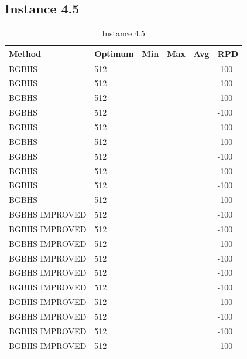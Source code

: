 \subsection{Instance 4.5}
\begin{table}[H]
\centering
\begin{tabular}{ | l | l | l | l | l | l | }
\hline
	Method & Optimum & Min & Max & Avg & RPD \\ \hline
	BGBHS & 512 &  &  &  & -100 \\ \hline
	BGBHS & 512 &  &  &  & -100 \\ \hline
	BGBHS & 512 &  &  &  & -100 \\ \hline
	BGBHS & 512 &  &  &  & -100 \\ \hline
	BGBHS & 512 &  &  &  & -100 \\ \hline
	BGBHS & 512 &  &  &  & -100 \\ \hline
	BGBHS & 512 &  &  &  & -100 \\ \hline
	BGBHS & 512 &  &  &  & -100 \\ \hline
	BGBHS & 512 &  &  &  & -100 \\ \hline
	BGBHS & 512 &  &  &  & -100 \\ \hline
	BGBHS IMPROVED & 512 &  &  &  & -100 \\ \hline
	BGBHS IMPROVED & 512 &  &  &  & -100 \\ \hline
	BGBHS IMPROVED & 512 &  &  &  & -100 \\ \hline
	BGBHS IMPROVED & 512 &  &  &  & -100 \\ \hline
	BGBHS IMPROVED & 512 &  &  &  & -100 \\ \hline
	BGBHS IMPROVED & 512 &  &  &  & -100 \\ \hline
	BGBHS IMPROVED & 512 &  &  &  & -100 \\ \hline
	BGBHS IMPROVED & 512 &  &  &  & -100 \\ \hline
	BGBHS IMPROVED & 512 &  &  &  & -100 \\ \hline
	BGBHS IMPROVED & 512 &  &  &  & -100 \\ \hline
\end{tabular}

\caption{Instance 4.5}
\label{tblscp45}
\end{table}
\newpage

